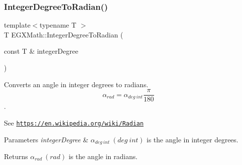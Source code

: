 \subsubsection{\texorpdfstring{Integer\+Degree\+To\+Radian()}{IntegerDegreeToRadian()}}
{\footnotesize\ttfamily template$<$typename T $>$ \\
T E\+G\+X\+Math\+::\+Integer\+Degree\+To\+Radian (\begin{DoxyParamCaption}\item[{const T \&}]{integer\+Degree }\end{DoxyParamCaption})}



Converts an angle in integer degrees to radians. \[\alpha_{rad}=\alpha_{deg\ int}\frac{\pi}{180}\]. 

See \href{https://en.wikipedia.org/wiki/Radian}{\tt https\+://en.\+wikipedia.\+org/wiki/\+Radian} 
\begin{DoxyParams}{Parameters}
{\em integer\+Degree} & $\alpha_{deg\ int}\ (deg\ int)$ is the angle in integer degrees. \\
\hline
\end{DoxyParams}
\begin{DoxyReturn}{Returns}
$\alpha_{rad}\ (rad)$ is the angle in radians. 
\end{DoxyReturn}
